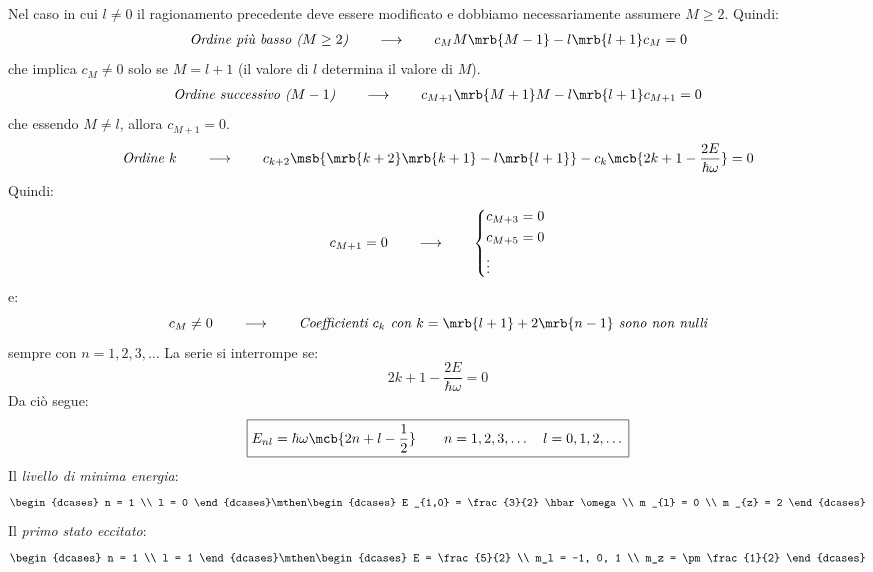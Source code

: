 Nel caso in cui $l \neq 0$ il ragionamento precedente deve essere modificato e
dobbiamo necessariamente assumere $M \geq 2$. Quindi:
\begin{align*}
  \textit{Ordine più basso ($M \geq 2$)}
  \qquad\longrightarrow\qquad
  c_M M \mrb{M - 1} - l \mrb{l + 1} c_M = 0
\end{align*}
che implica $c_M \neq 0$ solo se $M = l + 1$ (il valore di $l$ determina il
valore di $M$).
\begin{align*}
  \textit{Ordine successivo ($M - 1$)}
  \qquad\longrightarrow\qquad
  c _{M + 1} \mrb{M + 1} M - l \mrb{l + 1} c _{M + 1} = 0
\end{align*}
che essendo $M \neq l$, allora $c _{M + 1} = 0$.
\begin{align*}
  \textit{Ordine $k$}
  \qquad\longrightarrow\qquad
  c _{k + 2} \msb{\mrb{k + 2} \mrb{k + 1} - l \mrb{l + 1}} - c_k \mcb{2 k + 1 -
  \frac{2E}{\hbar \omega}} = 0
\end{align*}
Quindi:
\[
  c _{M + 1} = 0
  \qquad\longrightarrow\qquad
  \begin{dcases}
    c _{M + 3} = 0
    \\
    c _{M + 5} = 0
    \\
    \vdots
  \end{dcases}
\]
e:
\[
  c _{M} \neq 0
  \qquad\longrightarrow\qquad
  \textit{Coefficienti $c_k$ con } k = \mrb{l + 1} + 2 \mrb{n - 1} \textit{
    sono non nulli}
\]
sempre con $n = 1, 2, 3, \dots$
La serie si interrompe se:
\[
  2 k + 1 - \frac{2E}{\hbar \omega} = 0
\]
Da ciò segue:
\[
  \boxed{
    E _{nl} = \hbar \omega \mcb{2n + l - \frac{1}{2}}
    \qquad
    n = 1, 2, 3, \dots
    \quad
    l = 0, 1, 2, \dots
  }
\]
Il \textit{livello di minima energia}:
\[
  \begin{dcases}
    n = 1
    \\
    l = 0
  \end{dcases}
  \mthen
  \begin{dcases}
    E _{1,0} = \frac{3}{2} \hbar \omega
    \\
    m _{l} = 0
    \\
    m _{z} = 2
  \end{dcases}
\]
Il \textit{primo stato eccitato}:
\[
  \begin{dcases}
    n = 1
    \\
    l = 1
  \end{dcases}
  \mthen
  \begin{dcases}
    E = \frac{5}{2}
    \\
    m_l = -1, 0, 1
    \\
    m_z = \pm\frac{1}{2} %
  \end{dcases}
\]
